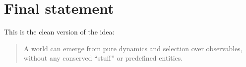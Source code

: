 \documentclass[11pt]{article}
\begin{document}
\section*{Final statement}

This is the clean version of the idea:

\begin{quote}
A world can emerge from pure dynamics and selection over observables, without any conserved ``stuff'' or predefined entities.
\end{quote}
\end{document}
